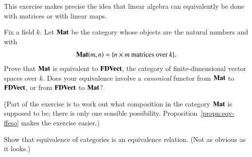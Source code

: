 \begin{question}
This exercise makes precise the idea that linear algebra can equivalently
be done with matrices%
%
%
or with linear maps.

Fix a field $k$.  Let $\mathbf{Mat}$ be the category whose objects are the natural
numbers and with
\[
\mathbf{Mat}(m, n)
=
\{ n \times m \text{ matrices over } k \}.
\]
Prove that $\mathbf{Mat}$ is equivalent to $\mathbf{FDVect}$, the category of
finite-dimensional vector%
%
%
spaces over $k$.  Does your equivalence involve a \emph{canonical} functor
from $\mathbf{Mat}$ to $\mathbf{FDVect}$, or from $\mathbf{FDVect}$ to $\mathbf{Mat}$?

(Part of the exercise is to work out what composition in the category $\mathbf{Mat}$
is supposed to be; there is only one sensible possibility.
Proposition~\ref{propn:eqv-ffeso} makes the exercise easier.)
\end{question}


\begin{question}
\label{ex:eqv-eq-reln}
Show that equivalence of categories is an equivalence relation.  (Not as
obvious as it looks.)
\end{question}
